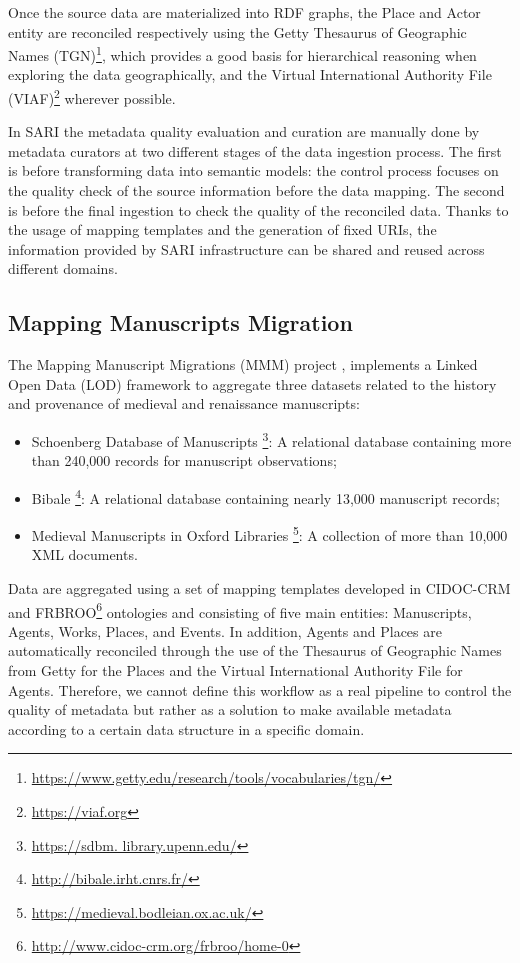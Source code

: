 \documentclass[epsfig,a4paper,12pt,titlepage]{book}
\begin{document}
Once the source data are materialized into RDF graphs, the Place and Actor entity are reconciled respectively using the Getty Thesaurus of Geographic Names (TGN)\footnote{\url{https://www.getty.edu/research/tools/vocabularies/tgn/}}, which provides a good basis for hierarchical reasoning when exploring the data geographically, and the Virtual International Authority File (VIAF)\footnote{\url{https://viaf.org}} wherever possible.

In SARI the metadata quality evaluation and curation are manually done by metadata curators at two different stages of the data ingestion process. The first is before transforming data into semantic models: the control process focuses on the quality check of the source information before the data mapping. The second is before the final ingestion to check the quality of the reconciled data. Thanks to the usage of mapping templates and the generation of fixed URIs, the information provided by SARI infrastructure can be shared and reused across different domains.

\subsection{Mapping Manuscripts Migration}
\label{sec:mmm}
The Mapping Manuscript Migrations (MMM) project \cite{burrows2020modelling}, implements a Linked Open Data (LOD) framework to aggregate three datasets related to the history and provenance of medieval and renaissance manuscripts:

\begin{itemize}
    \item  Schoenberg Database of Manuscripts \footnote{\url{https://sdbm. library.upenn.edu/}}: A relational database containing more than 240,000 records for manuscript observations;
\item Bibale \footnote{\url{http://bibale.irht.cnrs.fr/}}: A relational database containing nearly 13,000 manuscript records;
\item Medieval Manuscripts in Oxford Libraries \footnote{\url{https://medieval.bodleian.ox.ac.uk/}}: A collection of more than 10,000 XML documents.
\end{itemize}

Data are aggregated using a set of mapping templates developed in CIDOC-CRM and FRBROO\footnote{\url{http://www.cidoc-crm.org/frbroo/home-0}} ontologies and consisting of five main entities: Manuscripts, Agents, Works, Places, and Events. In addition, Agents and Places are automatically reconciled through the use of the Thesaurus of Geographic Names from Getty for the Places and the Virtual International Authority File for Agents. Therefore, we cannot define this workflow as a real pipeline to control the quality of metadata but rather as a solution to make available metadata according to a certain data structure in a specific domain.\color{black}
\end{document}
